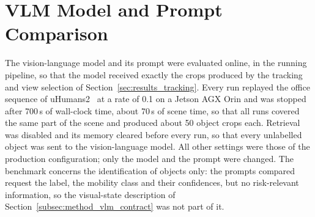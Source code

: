 
\vlmTable


\section{VLM Model and Prompt Comparison}
\label{sec:results_vlm}

{\small The vision-language model and its prompt were evaluated online, in the running pipeline, so that the model received exactly the crops produced by the tracking and view selection of Section~\ref{sec:results_tracking}. Every run replayed the office sequence of uHumans2~\cite{rosinol2021kimera} at a rate of 0.1 on a Jetson AGX Orin and was stopped after 700\,s of wall-clock time, about 70\,s of scene time, so that all runs covered the same part of the scene and produced about 50 object crops each. Retrieval was disabled and its memory cleared before every run, so that every unlabelled object was sent to the vision-language model. All other settings were those of the production configuration; only the model and the prompt were changed. The benchmark concerns the identification of objects only: the prompts compared request the label, the mobility class and their confidences, but no risk-relevant information, so the visual-state description of Section~\ref{subsec:method_vlm_contract} was not part of it.\par}

